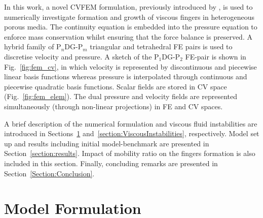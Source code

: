 \documentclass[preprint,authoryear,12pt]{elsarticle}
\newcommand{\PN}[2][error]{P$_{#1}$DG-P$_{#2}$}
\begin{document}
\medskip 
In this work, a novel CVFEM formulation, previously introduced by \citet{gomes_2017} \citep[see also][]{jackson_2015,salinas2015}, is used to numerically investigate formation and growth of viscous fingers in heterogeneous porous media. The continuity equation is embedded into the pressure equation to enforce mass conservation whilst ensuring that the force balance is preserved. A hybrid family of \PN[n]{m} triangular and tetrahedral FE pairs is used to discretise velocity and pressure. %
A sketch of the \PN[1]{2} FE-pair is shown in Fig.~\ref{fig:fem_cv}, in which velocity is represented by discontinuous and piecewise linear basis functions whereas pressure is interpolated through continuous and piecewise quadratic basis functions. Scalar fields are stored in CV space (Fig.~\ref{fig:fem_elem}). The dual pressure and velocity fields are represented simultaneously (through non-linear projections) in FE and CV spaces. 
 
\medskip
A brief description of the numerical formulation and viscous fluid instabilities are introduced in Sections~\ref{equations_scheme} and~\ref{section:ViscousInstabilities}, respectively. Model set up and results including initial model-benchmark are presented in Section~\ref{section:results}. Impact of mobility ratio on the fingers formation is also included in this section. Finally, concluding remarks are presented in Section~\ref{Section:Conclusion}.

\section{Model Formulation}\label{equations_scheme}      
\end{document}
